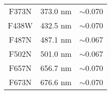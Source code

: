 \documentclass[11pt,fleqn]{book} %
\begin{document}
\begin{table}[h]
\begin{tabular}{ c c c }
																																																																																																																																																																																								          F373N & 373.0 nm & $\sim$0.070\\
																																																																																																																																																																																									      
																																																																																																																																																																																									          F438W & 432.5 nm & $\sim$0.070\\
																																																																																																																																																																																										      
																																																																																																																																																																																										          F487N & 487.1 nm & $\sim$0.067\\
																																																																																																																																																																																											      
																																																																																																																																																																																											          F502N & 501.0 nm & $\sim$0.067\\
																																																																																																																																																																																												      
																																																																																																																																																																																												          F657N & 656.7 nm & $\sim$0.070\\
																																																																																																																																																																																													      
																																																																																																																																																																																													          F673N & 676.6 nm & $\sim$0.070\\
																																																																																																																																																																																														      

\end{tabular}
\end{table}
\end{document}
